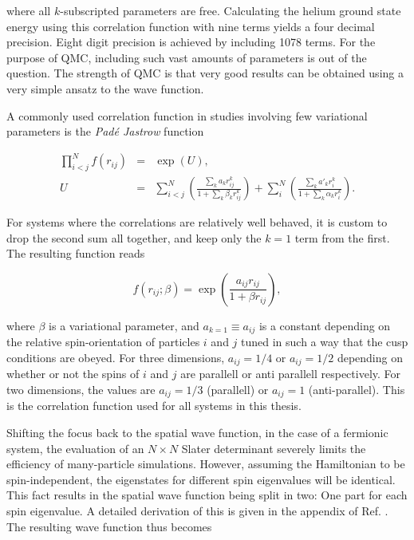 where all $k$-subscripted parameters are free. Calculating the helium ground state energy using this correlation function with nine terms yields a four decimal precision. Eight digit precision is achieved by including 1078 terms. For the purpose of QMC, including such vast amounts of parameters is out of the question. The strength of QMC is that very good results can be obtained using a very simple ansatz to the wave function. 

A commonly used correlation function in studies involving few variational parameters is the \textit{Padé Jastrow} function

\begin{eqnarray*}
 \prod_{i<j}^Nf(r_{ij}) &=& \exp(U), \\
         U &=&  \sum_{i<j}^N\left(\frac{\sum_k a_kr_{ij}^k}{1 + \sum_k \beta_kr_{ij}^k}\right) + \sum_i^N\left(\frac{\sum_k a'_kr_i^k}{1 + \sum_k \alpha_kr_i^k}\right).
\end{eqnarray*}

For systems where the correlations are relatively well behaved, it is custom to drop the second sum all together, and keep only the $k=1$ term from the first. The resulting function reads

\begin{equation}
 \label{eq:jastrow}
 f(r_{ij}; \beta) = \exp\left(\frac{a_{ij} r_{ij}}{1 + \beta r_{ij}}\right),
\end{equation}

where $\beta$ is a variational parameter, and $a_{k=1} \equiv a_{ij}$ is a constant depending on the relative spin-orientation of particles $i$ and $j$ tuned in such a way that the cusp conditions are obeyed. For three dimensions, $a_{ij} = 1/4$ or $a_{ij} = 1/2$ depending on whether or not the spins of $i$ and $j$ are parallell or anti parallell respectively\cite{abInitioMC}. For two dimensions, the values are $a_{ij}=1/3$ (parallell) or $a_{ij}=1$ (anti-parallel)\cite{larseivind}. This is the correlation function used for all systems in this thesis.

Shifting the focus back to the spatial wave function, in the case of a fermionic system, the evaluation of an $N\times N$ Slater determinant severely limits the efficiency of many-particle simulations. However, assuming the Hamiltonian to be spin-independent, the eigenstates for different spin eigenvalues will be identical. This fact results in the spatial wave function being split in two: One part for each spin eigenvalue. A detailed derivation of this is given in the appendix of Ref. \cite{QMCPHD2008}. The resulting wave function thus becomes

